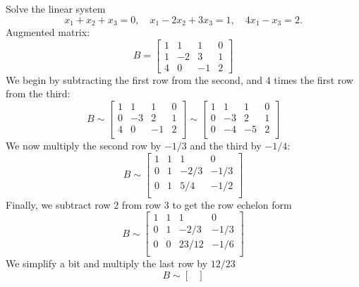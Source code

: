 \begin{myExample}{}{}
Solve the linear system
\begin{equation}
    x_1 + x_2 + x_3 = 0, \quad x_1 - 2 x_2 + 3 x_3 = 1, \quad 4 x_1 - x_3 = 2.
\end{equation}
Augmented matrix:
\begin{equation}
B =    \begin{bmatrix}
        1 & 1 & 1 & 0 \\
        1 & -2 & 3 & 1 \\
        4 & 0 & -1 & 2
    \end{bmatrix}
\end{equation}
We begin by subtracting the first row from the second, and 4 times the first row from the third:
\begin{equation}
B \sim \begin{bmatrix}
    1 & 1 & 1 & 0 \\
    0 & -3 & 2 & 1 \\
    4 & 0 & -1 & 2 \\
\end{bmatrix} \sim
\begin{bmatrix}
    1 & 1 & 1 & 0 \\
    0 & -3 & 2 & 1 \\
    0 & -4 & -5 & 2 \\
\end{bmatrix}
\end{equation}
We now multiply the second row by $-1/3$ and the third by $-1/4$:
\begin{equation}
B \sim \begin{bmatrix}
    1 & 1 & 1 & 0 \\
    0 & 1 & -2/3 & -1/3 \\
    0 & 1 & 5/4 & -1/2 \\
\end{bmatrix}
\end{equation}
Finally, we subtract row 2 from row 3 to get the row echelon form
\begin{equation}
B \sim \begin{bmatrix}
    1 & 1 & 1 & 0 \\
    0 & 1 & -2/3 & -1/3 \\
    0 & 0 & 23/12 & -1/6 \\
\end{bmatrix}
\end{equation}
We simplify a bit and multiply the last row by $12/23$
\begin{equation}
B \sim \begin{bmatrix}

\end{bmatrix}
\end{equation}
\end{myExample}
